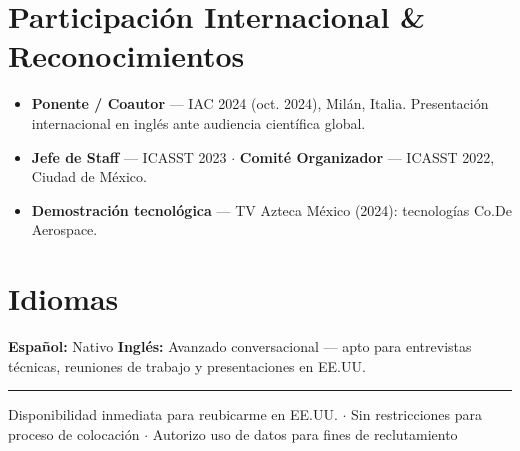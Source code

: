 \documentclass[10pt, letterpaper]{article}
\begin{document}
\section{Participaci\'{o}n Internacional \& Reconocimientos}

{\small\color{gristexto}
\begin{itemize}
  \item \textbf{Ponente / Coautor} --- IAC 2024 (oct. 2024), Mil\'{a}n, Italia. Presentaci\'{o}n internacional en ingl\'{e}s ante audiencia cient\'{i}fica global.
  \item \textbf{Jefe de Staff} --- ICASST 2023 $\cdot$ \textbf{Comit\'{e} Organizador} --- ICASST 2022, Ciudad de M\'{e}xico.
  \item \textbf{Demostraci\'{o}n tecnol\'{o}gica} --- TV Azteca M\'{e}xico (2024): tecnolog\'{i}as Co.De Aerospace.
\end{itemize}
}

\section{Idiomas}

{\small\color{gristexto}
\textbf{Espa\~{n}ol:} Nativo \quad \textbf{Ingl\'{e}s:} Avanzado conversacional --- apto para entrevistas t\'{e}cnicas, reuniones de trabajo y presentaciones en EE.UU.
}

\vspace{3pt}
{\color{lineagris}\rule{\linewidth}{0.3pt}}
{\footnotesize\centering\color{gristexto}
Disponibilidad inmediata para reubicarme en EE.UU. \textbf{$\cdot$} Sin restricciones para proceso de colocaci\'{o}n \textbf{$\cdot$} Autorizo uso de datos para fines de reclutamiento
}
\end{document}
